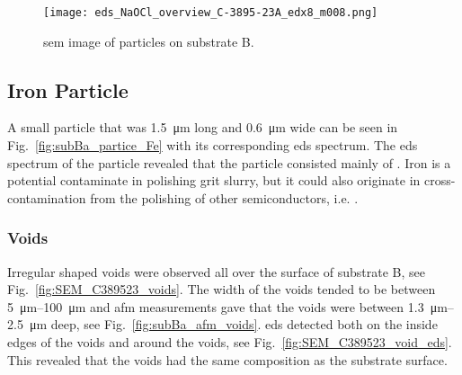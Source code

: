 \begin{figure}[htbp]
    \centering
    \texttt{[image: eds\_NaOCl\_overview\_C-3895-23A\_edx8\_m008.png]}
    \caption[\Ac{sem} image of  particles on substrate B.]{\Ac{sem} image of  particles on substrate B.}
    \label{fig:eds_NaOCl_overview}
\end{figure}

\subsection{Iron Particle}
A small particle that was \SI{1.5}{\micro\metre} long and \SI{0.6}{\micro\metre} wide can be seen in Fig.~\ref{fig:subBa_partice_Fe} with its corresponding \ac{eds} spectrum. The \ac{eds} spectrum of the particle revealed that the particle consisted mainly of . Iron is a potential contaminate in polishing grit slurry, but it could also originate in cross-contamination from the polishing of other semiconductors, i.e.  \citep{benson2015as-received}.

\subsubsection{Voids}
Irregular shaped voids were observed all over the surface of substrate B, see Fig.~\ref{fig:SEM_C389523_voids}. The width of the voids tended to be between \SIrange{5}{100}{\micro\metre} and \ac{afm} measurements gave that the voids were between \SIrange{1.3}{2.5}{\micro\metre} deep, see Fig.~\ref{fig:subBa_afm_voids}. \Ac{eds} detected  both on the inside edges of the voids and around the voids, see Fig.~\ref{fig:SEM_C389523_void_eds}. This revealed that the voids had the same composition as the substrate surface.

